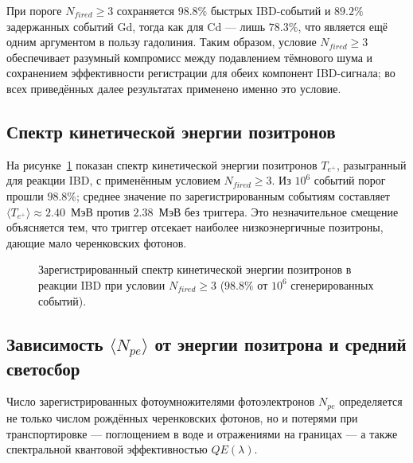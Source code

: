 \documentclass[a4paper,12pt]{extarticle}
\begin{document}
При пороге $N_{fired}\ge 3$ сохраняется $98.8\%$ быстрых IBD-событий и $89.2\%$ задержанных событий Gd, тогда как для Cd --- лишь $78.3\%$, что является ещё одним аргументом в пользу гадолиния. Таким образом, условие $N_{fired}\ge 3$ обеспечивает разумный компромисс между подавлением тёмнового шума и сохранением эффективности регистрации для обеих компонент IBD-сигнала; во всех приведённых далее результатах применено именно это условие.

\subsection{Спектр кинетической энергии позитронов}
На рисунке~\ref{fig:pos_spectrum} показан спектр кинетической энергии позитронов $T_{e^+}$, разыгранный для реакции IBD, с применённым условием $N_{fired}\ge 3$. Из $10^6$ событий порог прошли $98.8\%$; среднее значение по зарегистрированным событиям составляет $\langle T_{e^+}\rangle\approx 2.40$~МэВ против $2.38$~МэВ без триггера. Это незначительное смещение объясняется тем, что триггер отсекает наиболее низкоэнергичные позитроны, дающие мало черенковских фотонов.

\begin{figure}[h!]
\centering
{}
\caption{Зарегистрированный спектр кинетической энергии позитронов в реакции IBD при условии $N_{fired}\ge 3$ ($98.8\%$ от $10^6$ сгенерированных событий).}
\label{fig:pos_spectrum}
\end{figure}

\newpage

\subsection{Зависимость $\langle N_{pe}\rangle$ от энергии позитрона и средний светосбор}
Число зарегистрированных фотоумножителями фотоэлектронов $N_{pe}$ определяется не только числом рождённых черенковских фотонов, но и потерями при транспортировке --- поглощением в воде и отражениями на границах --- а также спектральной квантовой эффективностью $QE(\lambda)$.
\end{document}
